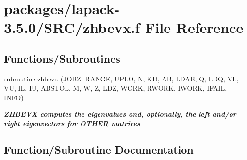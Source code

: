 \hypertarget{zhbevx_8f}{}\section{packages/lapack-\/3.5.0/\+S\+R\+C/zhbevx.f File Reference}
\label{zhbevx_8f}
\subsection*{Functions/\+Subroutines}
\begin{DoxyCompactItemize}
\item 
subroutine \hyperlink{zhbevx_8f_ae5f2fa86e4c29e27fccf6cb9ea1c54a2}{zhbevx} (J\+O\+B\+Z, R\+A\+N\+G\+E, U\+P\+L\+O, \hyperlink{polmisc_8c_a0240ac851181b84ac374872dc5434ee4}{N}, K\+D, A\+B, L\+D\+A\+B, Q, L\+D\+Q, V\+L, V\+U, I\+L, I\+U, A\+B\+S\+T\+O\+L, M, W, Z, L\+D\+Z, W\+O\+R\+K, R\+W\+O\+R\+K, I\+W\+O\+R\+K, I\+F\+A\+I\+L, I\+N\+F\+O)
\begin{DoxyCompactList}\small\item\em {\bfseries  Z\+H\+B\+E\+V\+X computes the eigenvalues and, optionally, the left and/or right eigenvectors for O\+T\+H\+E\+R matrices} \end{DoxyCompactList}\end{DoxyCompactItemize}


\subsection{Function/\+Subroutine Documentation}
\hypertarget{zhbevx_8f_ae5f2fa86e4c29e27fccf6cb9ea1c54a2}{}
